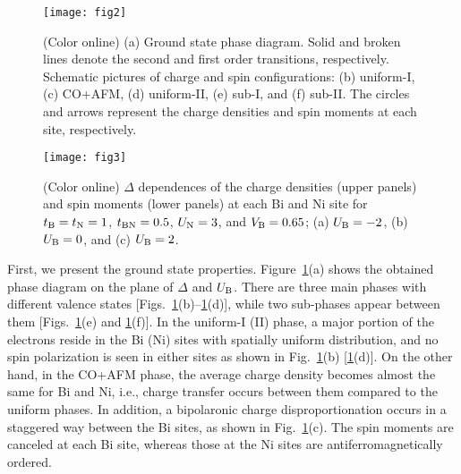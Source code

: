 \documentclass[aps,twocolumn,prl,showpacs,preprintnumbers,amsmath,amssymb]{revtex4}
\begin{document}
\begin{figure}[t]
\begin{center}
\texttt{[image: fig2]}
\end{center}
\caption{(Color online) 
(a) Ground state phase diagram. 
Solid and broken lines denote the second and first order transitions, respectively. 
Schematic pictures of charge and spin configurations: (b) uniform-I, (c) CO+AFM, (d) uniform-II, (e) sub-I, and (f) sub-II. 
The circles and arrows represent the charge densities and spin moments at each site, respectively. 
}
\label{fig:latt_pdgs}
\end{figure}
%
%
%
\begin{figure}[t]
\begin{center}
\texttt{[image: fig3]}
\end{center}
\caption{(Color online) 
$\Delta$ dependences of the charge densities (upper panels) and spin moments (lower panels) at each Bi and Ni site for $t_{\rm B} = t_{\rm N} =1$, $t_{\rm BN} = 0.5$, $U_{\rm N} = 3$, and $V_{\rm B} = 0.65$; (a) $U_{\rm B} = -2$, (b) $U_{\rm B} = 0$, and (c) $U_{\rm B} = 2$. 
}
\label{fig:op_gs}
\end{figure}
%
%
%
First, we present the ground state properties. 
Figure~\ref{fig:latt_pdgs}(a) shows the obtained phase diagram on the plane of $\Delta$ and $U_{\rm B}$. 
There are three main phases with different valence states [Figs.~\ref{fig:latt_pdgs}(b)--\ref{fig:latt_pdgs}(d)], while two sub-phases appear between them [Figs.~\ref{fig:latt_pdgs}(e) and \ref{fig:latt_pdgs}(f)]. 
In the uniform-I (II) phase, a major portion of the electrons reside in the Bi (Ni) sites with spatially uniform distribution, and no spin polarization is seen in either sites as shown in Fig.~\ref{fig:latt_pdgs}(b) [\ref{fig:latt_pdgs}(d)]. 
On the other hand, in the CO+AFM phase, the average charge density becomes almost the same for Bi and Ni, i.e., charge transfer occurs between them compared to the uniform phases. 
In addition, a bipolaronic charge disproportionation occurs in a staggered way between the Bi sites, as shown in Fig.~\ref{fig:latt_pdgs}(c). 
The spin moments are canceled at each Bi site, whereas those at the Ni sites are antiferromagnetically ordered. 
\end{document}
